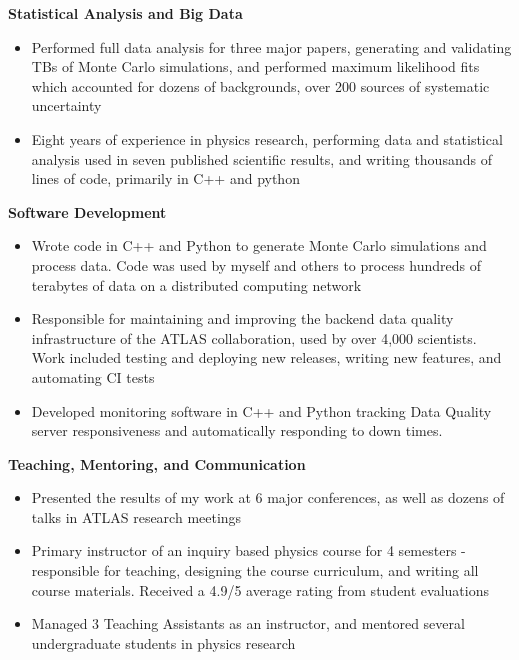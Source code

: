 \documentclass[a4paper,10pt]{article}
\begin{document}
\textbf{Statistical Analysis and Big Data}
\vspace{2mm}
\begin{itemize}[leftmargin=*, topsep=1pt, itemsep=0.5pt, parsep=0.5pt]
    \item Performed full data analysis for three major papers, generating and validating TBs of Monte Carlo simulations, and performed maximum likelihood fits which accounted for dozens of backgrounds, over 200 sources of systematic uncertainty
    \item Eight years of experience in physics research, performing data and statistical analysis used in seven published scientific results, and writing thousands of lines of code, primarily in C++ and python 
\end{itemize}

\textbf{Software Development}
\vspace{2mm}
\begin{itemize}[leftmargin=*, topsep=1pt, itemsep=0.5pt, parsep=0.5pt]
    \item Wrote code in C++ and Python to generate Monte Carlo simulations and process data. Code was used by myself and others to process hundreds of terabytes of data on a distributed computing network
    \item Responsible for maintaining and improving the backend data quality infrastructure of the ATLAS collaboration, used by over 4,000 scientists. Work included testing and deploying new releases, writing new features, and automating CI tests
    \item Developed monitoring software in C++ and Python tracking Data Quality server responsiveness and automatically responding to down times. 
\end{itemize}

\textbf{Teaching, Mentoring, and Communication}
\vspace{2mm}
\begin{itemize}[leftmargin=*, topsep=1pt, itemsep=0.5pt, parsep=0.5pt]
    \item Presented the results of my work at 6 major conferences, as well as dozens of talks in ATLAS research meetings
    \item Primary instructor of an inquiry based physics course for 4 semesters - responsible for teaching, designing the course curriculum, and writing all course materials. Received a 4.9/5 average rating from student evaluations
    \item Managed 3 Teaching Assistants as an instructor, and mentored several undergraduate students in physics research
\end{itemize}
\vspace{2mm}
\end{document}
